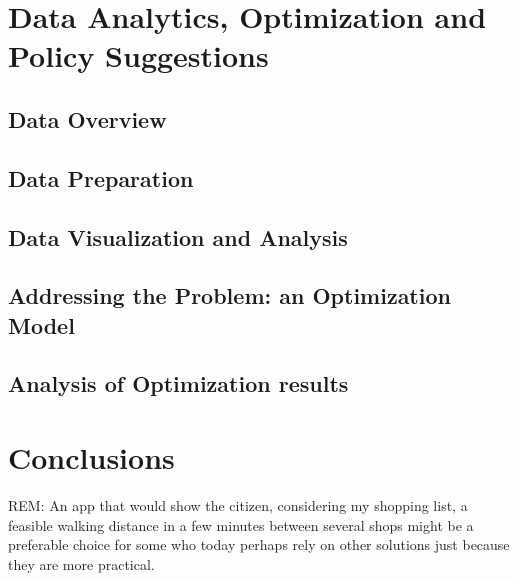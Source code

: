 




\newpage
\section{Data Analytics, Optimization and Policy Suggestions}

\subsection{Data Overview}

\subsection{Data Preparation}

\subsection{Data Visualization and Analysis}

\subsection{Addressing the Problem: an Optimization Model}

\subsection{Analysis of Optimization results}

\section*{Conclusions}

REM: 
An app that would show the citizen, considering my shopping list, a feasible walking distance in a few minutes between several shops might be a preferable choice for some who today perhaps rely on other solutions just because they are more practical.

\newpage





